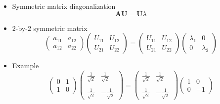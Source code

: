 \documentclass{beamer} %
\begin{document}
\begin{frame}
\begin{itemize}
\item Symmetric matrix diagonalization
\begin{equation*}
\mathbf{A} \mathbf{U} = \mathbf{U} \lambda 
\end{equation*}
\item 2-by-2 symmetric matrix
\begin{equation*}
\left ( \begin{matrix} a_{11} & a_{12}\\ a_{12} & a_{22} \end{matrix} \right )
\left ( \begin{matrix} U_{11} & U_{12}\\ U_{21} & U_{22} \end{matrix} \right )
= \left ( \begin{matrix} U_{11} & U_{12}\\ U_{21} & U_{22} \end{matrix} \right )
\left ( \begin{matrix} \lambda_{1} & 0 \\ 0 & \lambda_{2} \end{matrix} \right )
\end{equation*}
\item Example
\begin{equation*}
\left ( \begin{matrix} 0 & 1 \\ 1 & 0 \end{matrix} \right )
\left ( \begin{matrix}  \frac{1}{\sqrt{2}} & \frac{1}{\sqrt{2}} \\ & \\ \frac{1}{\sqrt{2}} & -\frac{1}{\sqrt{2}} \end{matrix} \right )
= \left ( \begin{matrix} \frac{1}{\sqrt{2}} & \frac{1}{\sqrt{2}} \\  & \\ \frac{1}{\sqrt{2}} & -\frac{1}{\sqrt{2}} \end{matrix} \right )
\left ( \begin{matrix} 1 & 0 \\ 0 & -1 \end{matrix} \right )
\end{equation*}
\end{itemize}
\end{frame}
\end{document}

